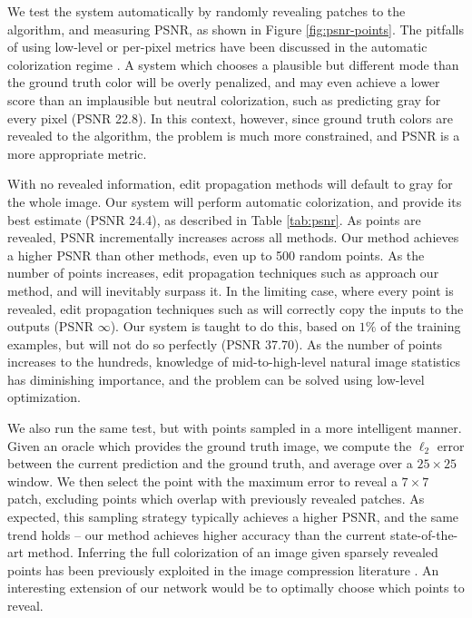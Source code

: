 \documentclass[acmtog,authorversion]{acmart}
\begin{document}
We test the system automatically by randomly revealing patches to the algorithm, and measuring PSNR, as shown in Figure \ref{fig:psnr-points}. The pitfalls of using low-level or per-pixel metrics have been discussed in the automatic colorization regime \cite{zhang2016colorful}. A system which chooses a plausible but different mode than the ground truth color will be overly penalized, and may even achieve a lower score than an implausible but neutral colorization, such as predicting gray for every pixel (PSNR 22.8). In this context, however, since ground truth colors are revealed to the algorithm, the problem is much more constrained, and PSNR is a more appropriate metric.

With no revealed information, edit propagation methods will default to gray for the whole image. Our system will perform automatic colorization, and provide its best estimate (PSNR 24.4), as described in Table \ref{tab:psnr}. As points are revealed, PSNR incrementally increases across all methods. Our method achieves a higher PSNR than other methods, even up to 500 random points. As the number of points increases, edit propagation techniques such as \cite{levin2004colorization} approach our method, and will inevitably surpass it. In the limiting case, where every point is revealed, edit propagation techniques such as \cite{levin2004colorization,poole2016fast,endo2016deepprop} will correctly copy the inputs to the outputs (PSNR $\infty$). Our system is taught to do this, based on $1\%$ of the training examples, but will not do so perfectly (PSNR 37.70). As the number of points increases to the hundreds, knowledge of mid-to-high-level natural image statistics has diminishing importance, and the problem can be solved using low-level optimization.

We also run the same test, but with points sampled in a more intelligent manner. Given an oracle which provides the ground truth image, we compute the $\ell_2$ error between the current prediction and the ground truth, and average over a $25\times 25$ window. We then select the point with the maximum error to reveal a $7\times 7$ patch, excluding points which overlap with previously revealed patches. As expected, this sampling strategy typically achieves a higher PSNR, and the same trend holds -- our method achieves higher accuracy than the current state-of-the-art method. Inferring the full colorization of an image given sparsely revealed points has been previously exploited in the image compression literature \cite{cheng2007learning,he2009unified}. An interesting extension of our network would be to optimally choose which points to reveal.
\end{document}
